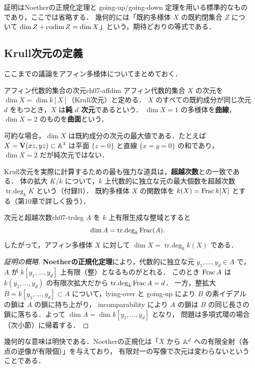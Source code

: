 証明はNoetherの正規化定理と going-up/going-down 定理を用いる標準的なものであり，ここでは省略する．
幾何的には「既約多様体 $X$ の既約閉集合 $Z$ について $\dim Z+\operatorname{codim} Z=\dim X$」という，期待どおりの等式である．

\subsection{Krull次元の定義}

ここまでの議論をアフィン多様体についてまとめておく．

\begin{mydef}{アフィン代数的集合の次元}{ch07-affdim}
アフィン代数的集合 $X$ の次元を $\dim X=\dim k[X]$（Krull次元）と定める．
$X$ のすべての既約成分が同じ次元 $d$ をもつとき，$X$ は\textbf{純 $d$ 次元}であるという．
$\dim X=1$ の多様体を\textbf{曲線}，$\dim X=2$ のものを\textbf{曲面}という．
\end{mydef}

可約な場合，$\dim X$ は既約成分の次元の最大値である．たとえば $X=\mathbf{V}(xz,yz)\subset\mathbb{A}^3$ は平面 $\{z=0\}$ と直線 $\{x=y=0\}$ の和であり，
$\dim X=2$ だが純次元ではない．

Krull次元を実際に計算するための最も強力な道具は，\textbf{超越次数}との一致である．
体の拡大 $K/k$ について，$k$ 上代数的に独立な元の最大個数を超越次数 $\mathop{\mathrm{tr.deg}}\nolimits_k K$ という（付録B）．
既約多様体 $X$ の関数体を $k(X)=\operatorname{Frac} k[X]$ とする（第10章で詳しく扱う）．

\begin{mythm}{次元と超越次数}{ch07-trdeg}
$A$ を $k$ 上有限生成な整域とすると
\[
  \dim A=\mathop{\mathrm{tr.deg}}\nolimits_k\operatorname{Frac}(A).
\]
したがって，アフィン多様体 $X$ に対して $\dim X=\mathop{\mathrm{tr.deg}}\nolimits_k k(X)$ である．
\end{mythm}

\begin{proof}[証明の概略]
\textbf{Noetherの正規化定理}により，代数的に独立な元 $y_1,\dots,y_d\in A$ で，$A$ が $k[y_1,\dots,y_d]$ 上有限（整）となるものがとれる．
このとき $\operatorname{Frac} A$ は $k(y_1,\dots,y_d)$ の有限次拡大だから $\mathop{\mathrm{tr.deg}}\nolimits_k\operatorname{Frac} A=d$．
一方，整拡大 $B=k[y_1,\dots,y_d]\subset A$ について，lying-over と going-up により $B$ の素イデアルの鎖は $A$ の鎖に持ち上がり，
incomparability により $A$ の鎖は $B$ の同じ長さの鎖に落ちる．よって $\dim A=\dim k[y_1,\dots,y_d]$ となり，
問題は多項式環の場合（次小節）に帰着する．
\end{proof}

幾何的な意味は明快である．Noetherの正規化は「$X$ から $\mathbb{A}^d$ への有限全射（各点の逆像が有限個）」を与えており，
有限対一の写像で次元は変わらないということである．

